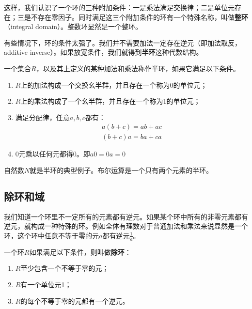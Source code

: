 \documentclass{article}
\begin{document}
这样，我们认识了一个环的三种附加条件：一是乘法满足交换律；二是单位元存在；三是不存在零因子。同时满足这三个附加条件的环有一个特殊名称，叫做\textbf{整环}（integral domain）。整数环显然是一个整环。

有些情况下，环的条件太强了。我们并不需要加法一定存在逆元（即加法取反，additive inverse）。如果放宽条件，我们就得到\textbf{半环}这种代数结构。

\begin{definition}
一个集合$R$，以及其上定义的某种加法和乘法称作半环，如果它满足以下条件。
\begin{enumerate}
\item $R$上的加法构成一个交换幺半群，并且存在一个称为0的单位元；
\item $R$上的乘法构成了一个幺半群，并且存在一个称为1的单位元；
\item 满足分配律，任意$a, b, c$都有：
\[
\begin{array}{l}
a(b + c) = ab + ac \\
(b + c)a = ba + ca
\end{array}
\]
\item 0元乘以任何元都得0。即$a0 = 0a = 0$
\end{enumerate}
\end{definition}
自然数$N$就是半环的典型例子。布尔运算是一个只有两个元素的半环。

\begin{Exercise}
\end{Exercise}

\subsection{除环和域}

我们知道一个环里不一定所有的元素都有逆元。如果某个环中所有的非零元素都有逆元，就构成一种特殊的环。例如全体有理数对于普通加法和乘法来说显然是一个环，这个环中任意不等于零的元$a$都有逆元$\frac{1}{a}$。

\begin{definition}
一个环$R$如果满足以下条件，则叫做\textbf{除环}：
\begin{enumerate}
\item $R$至少包含一个不等于零的元；
\item $R$有一个单位元1；
\item $R$的每个不等于零的元都有一个逆元。
\end{enumerate}
\end{definition}
\end{document}
